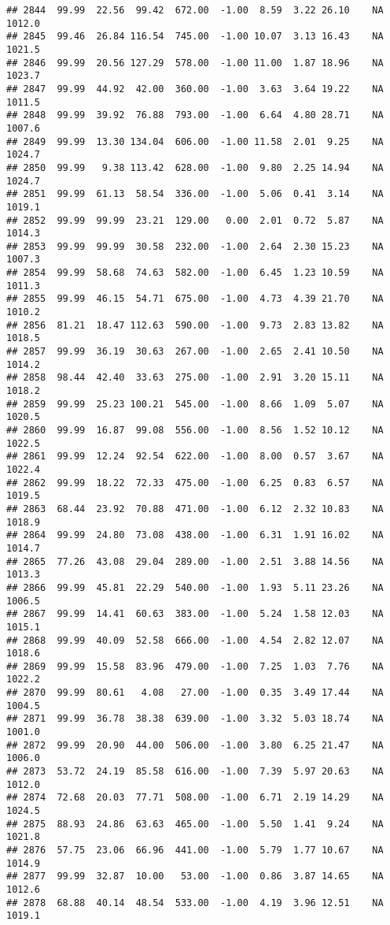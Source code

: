 \documentclass{article}\usepackage{graphicx, color}
\makeatletter
\newenvironment{kframe}{%
 \def\at@end@of@kframe{}%
 \ifinner\ifhmode%
  \def\at@end@of@kframe{\end{minipage}}%
  \begin{minipage}{\columnwidth}%
 \fi\fi%
 \def\FrameCommand##1{\hskip\@totalleftmargin \hskip-\fboxsep
 \colorbox{shadecolor}{##1}\hskip-\fboxsep
     \hskip-\linewidth \hskip-\@totalleftmargin \hskip\columnwidth}%
 \MakeFramed {\advance\hsize-\width
   \@totalleftmargin\z@ \linewidth\hsize
   \@setminipage}}%
 {\par\unskip\endMakeFramed%
 \at@end@of@kframe}
\newenvironment{knitrout}{}{} %
\makeatother
\begin{document}
\begin{knitrout}
\begin{kframe}
\begin{verbatim}
## 2844  99.99  22.56  99.42  672.00  -1.00  8.59  3.22 26.10    NA 1012.0
## 2845  99.46  26.84 116.54  745.00  -1.00 10.07  3.13 16.43    NA 1021.5
## 2846  99.99  20.56 127.29  578.00  -1.00 11.00  1.87 18.96    NA 1023.7
## 2847  99.99  44.92  42.00  360.00  -1.00  3.63  3.64 19.22    NA 1011.5
## 2848  99.99  39.92  76.88  793.00  -1.00  6.64  4.80 28.71    NA 1007.6
## 2849  99.99  13.30 134.04  606.00  -1.00 11.58  2.01  9.25    NA 1024.7
## 2850  99.99   9.38 113.42  628.00  -1.00  9.80  2.25 14.94    NA 1024.7
## 2851  99.99  61.13  58.54  336.00  -1.00  5.06  0.41  3.14    NA 1019.1
## 2852  99.99  99.99  23.21  129.00   0.00  2.01  0.72  5.87    NA 1014.3
## 2853  99.99  99.99  30.58  232.00  -1.00  2.64  2.30 15.23    NA 1007.3
## 2854  99.99  58.68  74.63  582.00  -1.00  6.45  1.23 10.59    NA 1011.3
## 2855  99.99  46.15  54.71  675.00  -1.00  4.73  4.39 21.70    NA 1010.2
## 2856  81.21  18.47 112.63  590.00  -1.00  9.73  2.83 13.82    NA 1018.5
## 2857  99.99  36.19  30.63  267.00  -1.00  2.65  2.41 10.50    NA 1014.2
## 2858  98.44  42.40  33.63  275.00  -1.00  2.91  3.20 15.11    NA 1018.2
## 2859  99.99  25.23 100.21  545.00  -1.00  8.66  1.09  5.07    NA 1020.5
## 2860  99.99  16.87  99.08  556.00  -1.00  8.56  1.52 10.12    NA 1022.5
## 2861  99.99  12.24  92.54  622.00  -1.00  8.00  0.57  3.67    NA 1022.4
## 2862  99.99  18.22  72.33  475.00  -1.00  6.25  0.83  6.57    NA 1019.5
## 2863  68.44  23.92  70.88  471.00  -1.00  6.12  2.32 10.83    NA 1018.9
## 2864  99.99  24.80  73.08  438.00  -1.00  6.31  1.91 16.02    NA 1014.7
## 2865  77.26  43.08  29.04  289.00  -1.00  2.51  3.88 14.56    NA 1013.3
## 2866  99.99  45.81  22.29  540.00  -1.00  1.93  5.11 23.26    NA 1006.5
## 2867  99.99  14.41  60.63  383.00  -1.00  5.24  1.58 12.03    NA 1015.1
## 2868  99.99  40.09  52.58  666.00  -1.00  4.54  2.82 12.07    NA 1018.6
## 2869  99.99  15.58  83.96  479.00  -1.00  7.25  1.03  7.76    NA 1022.2
## 2870  99.99  80.61   4.08   27.00  -1.00  0.35  3.49 17.44    NA 1004.5
## 2871  99.99  36.78  38.38  639.00  -1.00  3.32  5.03 18.74    NA 1001.0
## 2872  99.99  20.90  44.00  506.00  -1.00  3.80  6.25 21.47    NA 1006.0
## 2873  53.72  24.19  85.58  616.00  -1.00  7.39  5.97 20.63    NA 1012.0
## 2874  72.68  20.03  77.71  508.00  -1.00  6.71  2.19 14.29    NA 1024.5
## 2875  88.93  24.86  63.63  465.00  -1.00  5.50  1.41  9.24    NA 1021.8
## 2876  57.75  23.06  66.96  441.00  -1.00  5.79  1.77 10.67    NA 1014.9
## 2877  99.99  32.87  10.00   53.00  -1.00  0.86  3.87 14.65    NA 1012.6
## 2878  68.88  40.14  48.54  533.00  -1.00  4.19  3.96 12.51    NA 1019.1

\end{verbatim}
\end{kframe}
\end{knitrout}
\end{document}
